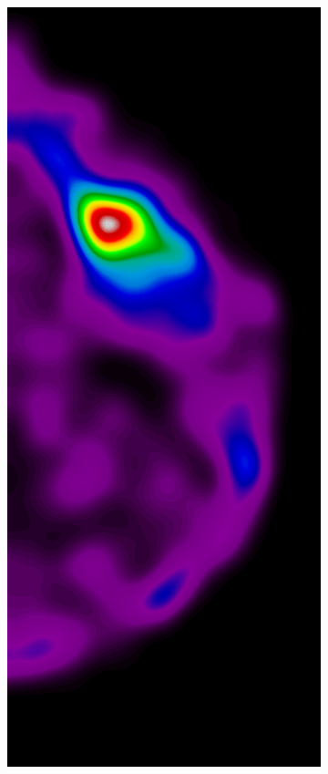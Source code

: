 \documentclass{beamer}
\begin{document}
\begin{frame}
\begin{figure}
\begin{subfigure}{0.134\textwidth}
            \end{subfigure}
            \begin{subfigure}{0.134\textwidth}
	            \centering
		            \includegraphics[width=\textwidth]{plots/examples/example2_probs_1_2.png}

\end{subfigure}
\end{figure}
\end{frame}
\end{document}
